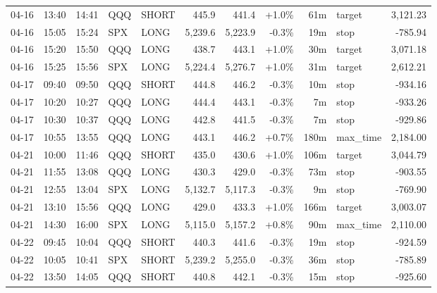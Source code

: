 \documentclass[11pt,a4paper,twoside]{article}
\begin{document}
\begin{center}
\begin{longtable}{>{\color{txtmain}}l l l l l r r r r >{\color{txtmain}}l r}
04-16 & 13:40 & 14:41 & QQQ & SHORT & 445.9 & 441.4 & \textcolor{wingreen}{+1.0\%} & 61m & target & \textcolor{wingreen}{3,121.23} \\
04-16 & 15:05 & 15:24 & SPX & LONG & 5,239.6 & 5,223.9 & \textcolor{lossred}{-0.3\%} & 19m & stop & \textcolor{lossred}{-785.94} \\
04-16 & 15:20 & 15:50 & QQQ & LONG & 438.7 & 443.1 & \textcolor{wingreen}{+1.0\%} & 30m & target & \textcolor{wingreen}{3,071.18} \\
04-16 & 15:25 & 15:56 & SPX & LONG & 5,224.4 & 5,276.7 & \textcolor{wingreen}{+1.0\%} & 31m & target & \textcolor{wingreen}{2,612.21} \\
04-17 & 09:40 & 09:50 & QQQ & SHORT & 444.8 & 446.2 & \textcolor{lossred}{-0.3\%} & 10m & stop & \textcolor{lossred}{-934.16} \\
04-17 & 10:20 & 10:27 & QQQ & LONG & 444.4 & 443.1 & \textcolor{lossred}{-0.3\%} & 7m & stop & \textcolor{lossred}{-933.26} \\
04-17 & 10:30 & 10:37 & QQQ & LONG & 442.8 & 441.5 & \textcolor{lossred}{-0.3\%} & 7m & stop & \textcolor{lossred}{-929.86} \\
04-17 & 10:55 & 13:55 & QQQ & LONG & 443.1 & 446.2 & \textcolor{wingreen}{+0.7\%} & 180m & max\_time & \textcolor{wingreen}{2,184.00} \\
04-21 & 10:00 & 11:46 & QQQ & SHORT & 435.0 & 430.6 & \textcolor{wingreen}{+1.0\%} & 106m & target & \textcolor{wingreen}{3,044.79} \\
04-21 & 11:55 & 13:08 & QQQ & LONG & 430.3 & 429.0 & \textcolor{lossred}{-0.3\%} & 73m & stop & \textcolor{lossred}{-903.55} \\
04-21 & 12:55 & 13:04 & SPX & LONG & 5,132.7 & 5,117.3 & \textcolor{lossred}{-0.3\%} & 9m & stop & \textcolor{lossred}{-769.90} \\
04-21 & 13:10 & 15:56 & QQQ & LONG & 429.0 & 433.3 & \textcolor{wingreen}{+1.0\%} & 166m & target & \textcolor{wingreen}{3,003.07} \\
04-21 & 14:30 & 16:00 & SPX & LONG & 5,115.0 & 5,157.2 & \textcolor{wingreen}{+0.8\%} & 90m & max\_time & \textcolor{wingreen}{2,110.00} \\
04-22 & 09:45 & 10:04 & QQQ & SHORT & 440.3 & 441.6 & \textcolor{lossred}{-0.3\%} & 19m & stop & \textcolor{lossred}{-924.59} \\
04-22 & 10:05 & 10:41 & SPX & SHORT & 5,239.2 & 5,255.0 & \textcolor{lossred}{-0.3\%} & 36m & stop & \textcolor{lossred}{-785.89} \\
04-22 & 13:50 & 14:05 & QQQ & SHORT & 440.8 & 442.1 & \textcolor{lossred}{-0.3\%} & 15m & stop & \textcolor{lossred}{-925.60} \\

\end{longtable}
\end{center}
\end{document}

